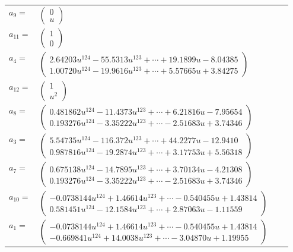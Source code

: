 \documentclass[1p]{elsarticle_modified}
\theoremstyle{definition}
\begin{document}
\begin{tabular}{m{7pt} m{180pt} m{7pt} m{180pt} }
\flushright $a_{9}=$&$\begin{pmatrix}0\\u\end{pmatrix}$ \\
\flushright $a_{11}=$&$\begin{pmatrix}1\\0\end{pmatrix}$ \\
\flushright $a_{4}=$&$\begin{pmatrix}2.64203 u^{124}-55.5313 u^{123}+\cdots+19.1899 u-8.04385\\1.00720 u^{124}-19.9616 u^{123}+\cdots+5.57665 u+3.84275\end{pmatrix}$ \\
\flushright $a_{12}=$&$\begin{pmatrix}1\\u^2\end{pmatrix}$ \\
\flushright $a_{8}=$&$\begin{pmatrix}0.481862 u^{124}-11.4373 u^{123}+\cdots+6.21816 u-7.95654\\0.193276 u^{124}-3.35222 u^{123}+\cdots-2.51683 u+3.74346\end{pmatrix}$ \\
\flushright $a_{3}=$&$\begin{pmatrix}5.54735 u^{124}-116.372 u^{123}+\cdots+44.2277 u-12.9410\\0.987816 u^{124}-19.2874 u^{123}+\cdots+3.17753 u+5.56318\end{pmatrix}$ \\
\flushright $a_{7}=$&$\begin{pmatrix}0.675138 u^{124}-14.7895 u^{123}+\cdots+3.70134 u-4.21308\\0.193276 u^{124}-3.35222 u^{123}+\cdots-2.51683 u+3.74346\end{pmatrix}$ \\
\flushright $a_{10}=$&$\begin{pmatrix}-0.0738144 u^{124}+1.46614 u^{123}+\cdots-0.540455 u+1.43814\\0.581451 u^{124}-12.1584 u^{123}+\cdots+2.87063 u-1.11559\end{pmatrix}$ \\
\flushright $a_{1}=$&$\begin{pmatrix}-0.0738144 u^{124}+1.46614 u^{123}+\cdots-0.540455 u+1.43814\\-0.669841 u^{124}+14.0038 u^{123}+\cdots-3.04870 u+1.19955\end{pmatrix}$ \\

\end{tabular}
\end{document}
